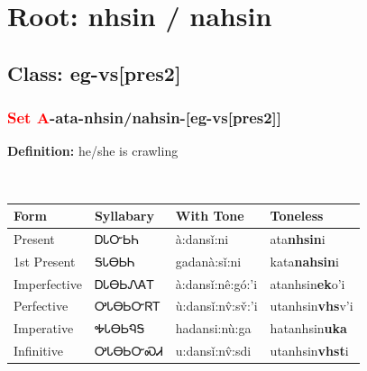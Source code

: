 \needspace{4in}
\section*{Root: nhsin / nahsin}
\nopagebreak
{}
\needspace{3in}
\subsection*{Class: eg-vs[pres2]}
\nopagebreak
\needspace{2in}
\subsubsection*{\textcolor{Red}{Set A}{-}ata{-}\textbf{nhsin/nahsin}{-}[eg-vs[pres2]]}
\nopagebreak
\textbf{Definition: } he/she is crawling
\\[0.5em]
\begin{tabularx}{\textwidth}{l X X X}%
\toprule%
\textbf{Form}&\textbf{Syllabary}&\textbf{With Tone}&\textbf{Toneless}\\%
\midrule%
Present&ᎠᏓᏅᏏᏂ&à:dansǐ:ni&ata\textbf{nhsin}i\\%
1st Present&ᎦᏓᎾᏏᏂ&gadanà:sǐ:ni&kata\textbf{nahsin}i\\%
Imperfective&ᎠᏓᎾᏏᏁᎪᎢ&à:dansǐ:nê:gó:’i&atanhsin\textbf{ek}o'i\\%
Perfective&ᎤᏓᎾᏏᏅᏒᎢ&ù:dansǐ:nv̂:sv̌:’i&utanhsin\textbf{vhs}v'i\\%
Imperative&ᎭᏓᎾᏏᏄᎦ&hadansi:nù:ga&hatanhsin\textbf{uka}\\%
Infinitive&ᎤᏓᎾᏏᏅᏍᏗ&u:dansǐ:nv̂:sdi&utanhsin\textbf{vhst}i\\%
\bottomrule%
\end{tabularx}
\\[1em]